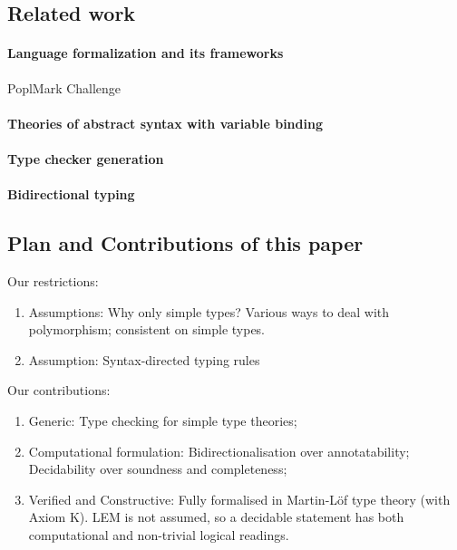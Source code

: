 \subsection{Related work}

\citep{Xie2018}
\paragraph{Language formalization and its frameworks}
\cite{Wadler2022}
PoplMark Challenge~\citep{Aydemir2005}

\cite{Cimini2020,Cimini2022}

\citep{Ahrens2018,Fiore2022,Gheri2020,Ahrens2022}
\cite{Allais2021}

\paragraph{Theories of abstract syntax with variable binding}
\cite{Fiore1999,Hirschowitz2010,Ahrens2018,Fiore2022,Ahrens2021,Arkor2020,Hirschowitz2022}
\cite{Fiore2013,Hamana2011,Hamana2022}


\paragraph{Type checker generation}
\cite{Gast2004,Grewe2015,Pacak2020,Cimini2020}

\paragraph{Bidirectional typing}

\cite{Pierce2000}
\cite{Peyton-Jones2007}
\cite{Dunfield2021}


\subsection{Plan and Contributions of this paper}

Our restrictions:
\begin{enumerate}
  \item Assumptions: Why only simple types? Various ways to deal with polymorphism; consistent on simple types.
  \item Assumption: Syntax-directed typing rules
\end{enumerate}

Our contributions:
\begin{enumerate}
  \item Generic: Type checking for simple type theories;
  \item Computational formulation: Bidirectionalisation over annotatability; Decidability over soundness and completeness;
  \item Verified and Constructive: Fully formalised in Martin-Löf type theory (with Axiom K).
    LEM is not assumed, so a decidable statement has both computational and non-trivial logical readings.
\end{enumerate}

